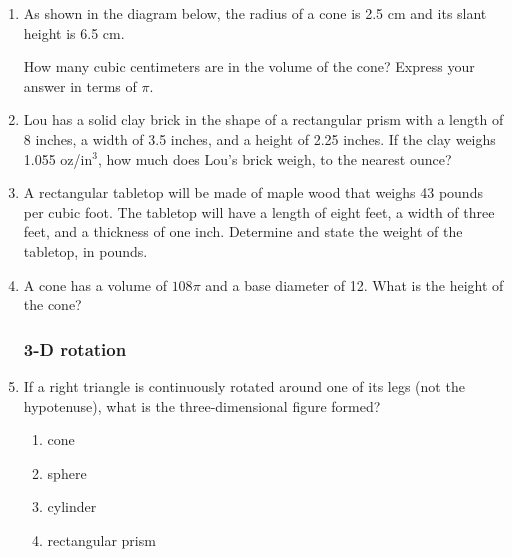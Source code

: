 \begin{enumerate}
\item As shown in the diagram below, the radius of a cone is 2.5 cm and its slant height is 6.5 cm.
  \begin{center}
  \end{center}
How many cubic centimeters are in the volume of the cone? Express your answer in terms of $\pi$. \vspace{3cm}

\newpage
\item Lou has a solid clay brick in the shape of a rectangular prism with a length of 8 inches, a width of 3.5 inches, and a height of 2.25 inches. If the clay weighs 1.055 oz/in$^3$, how much does Lou's brick weigh, to the nearest ounce? \vspace{4cm}

\item A rectangular tabletop will be made of maple wood that weighs 43 pounds per cubic foot. The tabletop will have a length of eight feet, a width of three feet, and a thickness of one inch. Determine and state the weight of the tabletop, in pounds. \vspace{4cm}

\item A cone has a volume of $108\pi$ and a base diameter of 12. What is the
height of the cone? \vspace{4cm}

\subsubsection*{3-D rotation}
\item If a right triangle is continuously rotated around one of its legs (not the hypotenuse), what is the three-dimensional figure formed?
  \begin{multicols}{2}
  \begin{enumerate}
    \item cone
    \item sphere
    \item cylinder
    \item rectangular prism
  \end{enumerate}
\end{multicols}


\end{enumerate}
